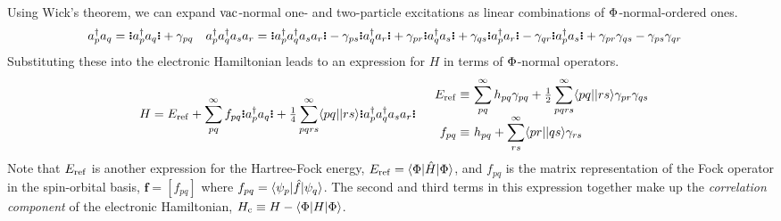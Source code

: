 \documentclass[11pt]{article}
\numberwithin{equation}{section}
\begin{document}
\begin{dfn}
Using Wick's theorem, we can expand $\mathrm{vac}$-normal one- and two-particle excitations as linear combinations of $\Phi $-normal-ordered ones.
\begin{align}
&
  a_p\dg a_q
=
  \gno{a_p\dg a_q}
+
  \g_{pq}
&&
  a_p\dg a_q\dg a_sa_r
=
  \gno{a_p\dg a_q\dg a_sa_r}
-
  \g_{ps}\gno{a_q\dg a_r}
+
  \g_{pr}\gno{a_q\dg a_s}
+
  \g_{qs}\gno{a_p\dg a_r}
-
  \g_{qr}\gno{a_p\dg a_s}
+
  \g_{pr}\g_{qs}
-
  \g_{ps}\g_{qr}
\end{align}
Substituting these into the electronic Hamiltonian leads to an expression for $H$ in terms of $\Phi $-normal operators.
\begin{align}
&&
  H
=
  E_\mr{ref}
+
  \sum_{pq}^\infty
  f_{pq}
  \gno{a_p\dg a_q}
+
  \tfr{1}{4}
  \sum_{pqrs}^\infty
  \ip{pq||rs}
  \gno{a_p\dg a_q\dg a_sa_r}
&&
\begin{array}{r@{\ }l}
  E_\mr{ref}
\equiv&
\ds{
  \sum_{pq}^\infty
  h_{pq}\g_{pq}
+
  \tfr{1}{2}
  \sum_{pqrs}^\infty
  \ip{pq||rs}
  \g_{pr}\g_{qs}
}
\\[5pt]
  f_{pq}
\equiv&
  h_{pq}
+
  \ds{\sum_{rs}^{\infty}}
  \ip{pr||qs}
  \g_{rs}
\end{array}
\end{align}
Note that $E_{\mathrm{ref}}$ is another expression for the Hartree-Fock energy, $E_{\mathrm{ref}}=\langle\Phi |\hat{H}|\Phi \rangle$, and $f_{pq}$ is the matrix representation of the Fock operator in the spin-orbital basis, $\bm{f}=[f_{pq}]$ where $f_{pq}=\langle\psi _p|\hat{f}|\psi _q\rangle$.
The second and third terms in this expression together make up the \textit{correlation component} of the electronic Hamiltonian, $H_{\mathrm{c}}\equiv H - \langle\Phi |H|\Phi \rangle$.
\end{dfn}
\end{document}
